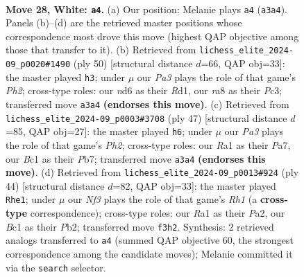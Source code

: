 \documentclass[11pt]{article}
\begin{document}
\clearpage

\begin{figure}[p]\centering
\begin{subfigure}{0.46\textwidth}\centering
\resizebox{\linewidth}{!}{%
\newchessgame
\chessboard[
  setfen={r2k1r1b/1ppb4/p2n4/3Npp2/7R/PB3N2/1P2KPP1/R1B5 w - - 7 28},
  showmover=false,
  pgfstyle=straightmove, color=movearrow, markmove={a3-a4}
]}
\caption{}
\end{subfigure}\hfill
\begin{subfigure}{0.46\textwidth}\centering
\resizebox{\linewidth}{!}{%
\newchessgame
\chessboard[
  setfen={5br1/1pr1k3/p3p1p1/4p1Np/2b5/2P5/P4PPP/1RBR2K1 w - - 0 26},
  showmover=false,
  pgfstyle=straightmove, color=movearrow, markmove={h2-h3}
]}
\caption{}
\end{subfigure}
\\[4pt]
\begin{subfigure}{0.46\textwidth}\centering
\resizebox{\linewidth}{!}{%
\newchessgame
\chessboard[
  setfen={2r5/pp2rppp/3k1n2/3P4/P1BR3P/1P3P2/5KP1/3R4 b - - 0 24},
  showmover=false,
  pgfstyle=straightmove, color=movearrow, markmove={h7-h6}
]}
\caption{}
\end{subfigure}\hfill
\begin{subfigure}{0.46\textwidth}\centering
\resizebox{\linewidth}{!}{%
\newchessgame
\chessboard[
  setfen={2k1rb1r/ppp4p/3n2p1/2N1p3/8/4B3/PPP2PPP/1K1R3R w - - 3 23},
  showmover=false,
  pgfstyle=straightmove, color=movearrow, markmove={h1-e1}
]}
\caption{}
\end{subfigure}
\caption{\textbf{Move 28, White: \texttt{a4}.} (a) Our position; Melanie plays \texttt{a4} (\texttt{a3a4}). Panels (b)--(d) are the retrieved master positions whose correspondence most drove this move (highest QAP objective among those that transfer to it). (b) Retrieved from \texttt{lichess\_elite\_2024-09\_p0020\#1490} (ply 50) [structural distance $d$=66, QAP obj=33]: the master played \texttt{h3}; under $\mu$ our \emph{Pa3} plays the role of that game's \emph{Ph2}; cross-type roles: our \emph{n}d6 as their \emph{R}d1, our \emph{r}a8 as their \emph{P}c3; transferred move \texttt{a3a4} \textbf{(endorses this move)}. (c) Retrieved from \texttt{lichess\_elite\_2024-09\_p0003\#3708} (ply 47) [structural distance $d$=85, QAP obj=27]: the master played \texttt{h6}; under $\mu$ our \emph{Pa3} plays the role of that game's \emph{Ph2}; cross-type roles: our \emph{R}a1 as their \emph{P}a7, our \emph{B}c1 as their \emph{P}b7; transferred move \texttt{a3a4} \textbf{(endorses this move)}. (d) Retrieved from \texttt{lichess\_elite\_2024-09\_p0013\#924} (ply 44) [structural distance $d$=82, QAP obj=33]: the master played \texttt{Rhe1}; under $\mu$ our \emph{Nf3} plays the role of that game's \emph{Rh1} (a \textbf{cross-type} correspondence); cross-type roles: our \emph{R}a1 as their \emph{P}a2, our \emph{B}c1 as their \emph{P}b2; transferred move \texttt{f3h2}. Synthesis: 2 retrieved analogs transferred to \texttt{a4} (summed QAP objective 60, the strongest correspondence among the candidate moves); Melanie committed it via the \texttt{search} selector.}
\label{fig:thought-m54}
\end{figure}
\end{document}
